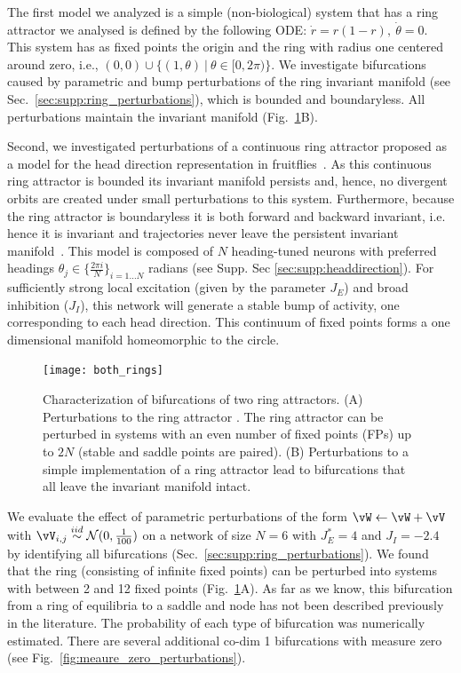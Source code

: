 \documentclass{article} %
\newcounter{ct}
\newcommand{\iidsample}{\stackrel{iid}{\sim}}
\theoremstyle{definition}
\theoremstyle{remark}
\begin{document}
The first model we analyzed is a simple (non-biological) system that has a ring attractor we analysed is defined by the following ODE: $\dot r = r(1-r), \ \dot \theta = 0.$
This system has as fixed points the origin and the ring with radius one centered around zero, i.e., $(0,0)\cup\{(1,\theta)\ |\ \theta\in[0,2\pi)\}$. We investigate bifurcations caused by parametric and bump perturbations of the ring invariant manifold (see Sec.~\ref{sec:supp:ring_perturbations}), which is bounded and boundaryless.
All perturbations maintain the invariant manifold (Fig.~\ref{fig:both_rings}B).

Second, we investigated perturbations of a continuous ring attractor proposed as a model for the head direction representation in fruitflies~\citep{Noorman2022}.
As this continuous ring attractor is bounded its invariant manifold persists and, hence, no divergent orbits are created under small perturbations to this system. 
Furthermore, because the ring attractor is boundaryless it is both forward and backward invariant, i.e. hence it is invariant and trajectories never leave the persistent invariant manifold~\citep{wiggins1994}.
This model is composed of $N$ heading-tuned neurons  with preferred headings $\theta_j \in \{\frac{2\pi i}{N}\}_{i=1\dots N}$ radians (see Supp. Sec \ref{sec:supp:headdirection}).
For sufficiently strong local excitation (given by the parameter $J_E$) and broad inhibition ($J_I$), this network will generate a stable bump of activity, one corresponding to each head direction. This continuum of fixed points forms a one dimensional manifold homeomorphic to the circle. 

\begin{figure}[tbhp]
     \centering
  \texttt{[image: both\_rings]}
       \caption{Characterization of bifurcations of two ring attractors. 
       (A)       Perturbations to the ring attractor \citep{Noorman2022}. The ring attractor can be perturbed in systems with an even number of fixed points (FPs)  up to $2N$ (stable and saddle points are paired). 
       (B) Perturbations to a simple implementation of a ring attractor lead to bifurcations that all leave the invariant manifold intact.
       }
         \label{fig:both_rings}
\end{figure}

We evaluate the effect of parametric perturbations of the form $ \vW \leftarrow \vW + \vV$ with $\vV_{i,j}\iidsample\mathcal{N}(0,\frac{1}{100})$ on a network of size $N = 6$ with $J_E^*= 4$ and $J_I=-2.4$ by identifying all bifurcations (Sec.~\ref{sec:supp:ring_perturbations}).
We found that the ring (consisting of infinite fixed points) can be perturbed into systems with between 2 and 12 fixed points (Fig.~\ref{fig:both_rings}A).
As far as we know, this bifurcation from a ring of equilibria to a saddle and node has not been described previously in the literature.
The probability of each type of bifurcation was numerically estimated.
There are several additional co-dim 1 bifurcations with measure zero (see Fig.~\ref{fig:meaure_zero_perturbations}).
\end{document}
